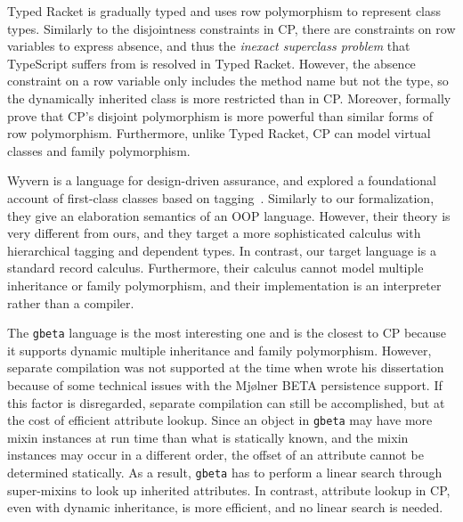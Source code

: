 Typed Racket is gradually typed and uses row polymorphism to represent class
types. Similarly to the disjointness constraints in CP, there are constraints on
row variables to express absence, and thus the \emph{inexact superclass problem}
that TypeScript suffers from is resolved in Typed Racket. However, the absence
constraint on a row variable only includes the method name but not the type, so
the dynamically inherited class is more restricted than in CP. Moreover,
\citet{xie2020row} formally prove that CP's disjoint polymorphism is more
powerful than similar forms of row polymorphism. Furthermore, unlike Typed
Racket, CP can model virtual classes and family polymorphism. 

Wyvern is a language for design-driven assurance, and \citet{lee2015theory}
explored a foundational account of first-class classes based on
tagging~\citep{glew1999type}. Similarly to our formalization, they give an
elaboration semantics of an OOP language. However, their theory is very
different from ours, and they target a more sophisticated calculus with
hierarchical tagging and dependent types. In contrast, our target language is a
standard record calculus. Furthermore, their calculus cannot model multiple
inheritance or family polymorphism, and their implementation is an interpreter
rather than a compiler.

The \texttt{gbeta} language is the most interesting one and is the closest to CP
because it supports dynamic multiple inheritance and family polymorphism.
However, separate compilation was not supported at the time when
\citet{ernst2000gbeta} wrote his dissertation because of some technical issues
with the Mjølner BETA persistence support. If this factor is disregarded,
separate compilation can still be accomplished, but at the cost of efficient
attribute lookup. Since an object in \texttt{gbeta} may have more mixin
instances at run time than what is statically known, and the mixin instances may
occur in a different order, the offset of an attribute cannot be determined
statically. As a result, \texttt{gbeta} has to perform a linear search through
super-mixins to look up inherited attributes. In contrast, attribute lookup in
CP, even with dynamic inheritance, is more efficient, and no linear search is
needed.

